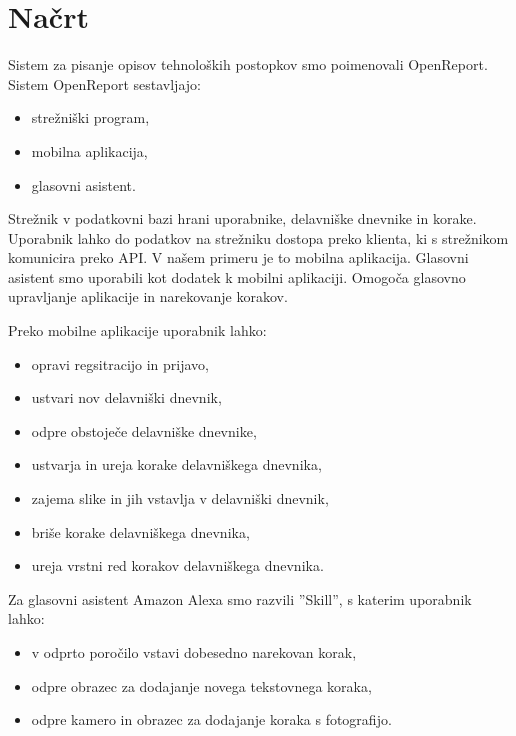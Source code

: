 \documentclass[a4paper, 12pt]{book}
\begin{document}
\section{Načrt}

Sistem za pisanje opisov tehnoloških postopkov smo poimenovali OpenReport. 
Sistem OpenReport sestavljajo:

\begin{itemize}
	\item strežniški program, 
	\item mobilna aplikacija,
	\item glasovni asistent.
\end{itemize}

Strežnik v podatkovni bazi hrani uporabnike, delavniške dnevnike in korake.
Uporabnik lahko do podatkov na strežniku dostopa preko klienta, ki s strežnikom komunicira preko API.
V našem primeru je to mobilna aplikacija.
Glasovni asistent smo uporabili kot dodatek k mobilni aplikaciji.
Omogoča glasovno upravljanje aplikacije in narekovanje korakov.

\noindent Preko mobilne aplikacije uporabnik lahko:
\begin{itemize}
	\item opravi regsitracijo in prijavo,
	\item ustvari nov delavniški dnevnik,
	\item odpre obstoječe delavniške dnevnike,
	\item ustvarja in ureja korake delavniškega dnevnika,
	\item zajema slike in jih vstavlja v delavniški dnevnik,
	\item briše korake delavniškega dnevnika,
	\item ureja vrstni red korakov delavniškega dnevnika.
\end{itemize}

Za glasovni asistent Amazon Alexa smo razvili ''Skill'', s katerim uporabnik lahko:

\begin{itemize}
	\item v odprto poročilo vstavi dobesedno narekovan korak,
	\item odpre obrazec za dodajanje novega tekstovnega koraka,
	\item odpre kamero in obrazec za dodajanje koraka s fotografijo.
\end{itemize}
\end{document}
